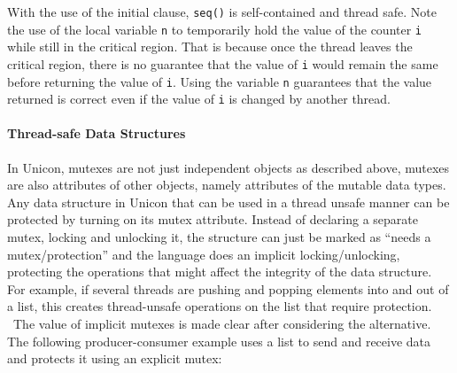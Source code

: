 With the use of the initial clause, \texttt{seq()} is
self-contained and thread safe. Note the use of the local variable
\texttt{n} to temporarily hold the value of the counter
\texttt{i} while still in the critical region. That is
because once the thread leaves the critical region, there is no
guarantee that the value of \texttt{i} would remain the same
before returning the value of \texttt{i}. Using the variable
\texttt{n} guarantees that the value returned is correct
even if the value of \texttt{i} is changed by another
thread.

\paragraph[Thread{}-safe Data Structures]{Thread-safe Data Structures}
In Unicon, mutexes are not just independent objects as described above,
mutexes are also attributes of other objects, namely attributes of the
mutable data types. Any data structure in Unicon that can be used in a
thread unsafe manner can be protected by turning on its mutex
attribute. Instead of declaring a separate mutex, locking and unlocking
it, the structure can just be marked as {\textquotedblleft}needs a
mutex/protection{\textquotedblright} and the language does an implicit
locking/unlocking, protecting the operations that might affect the
integrity of the data structure. For example, if several threads are
pushing and popping elements into and out of a list, this creates
thread-unsafe operations on the list that require protection. \ The
value of implicit mutexes is made clear after considering the
alternative. The following producer-consumer example uses a list to
send and receive data and protects it using an explicit mutex: 


